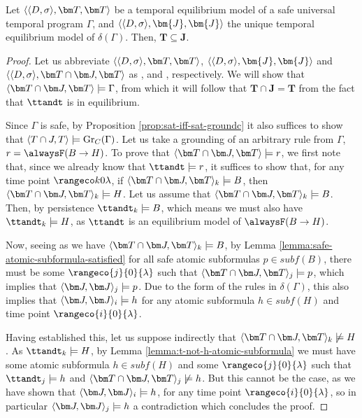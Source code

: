 \begin{proposition}\label{prop:simplified-facts}
  Let $\qttandt$ be a temporal equilibrium model of a safe universal
  temporal program $\Gamma$, and
  $\langle \dsigma, \bm{J},\bm{J} \rangle$ the unique temporal
  equilibrium model of $\delta(\Gamma)$. Then,
  $\bm{T} \subseteq \bm{J}$.
\end{proposition}
\begin{proof}
  Let us abbreviate $\qttandt$,
  $\langle \dsigma, \bm{J},\bm{J} \rangle$ and $\qttjandt$ as \ttandt,
  \tjandj and \ttjandt, respectively. We will show that
  $\ttjandt \models \Gamma$, from which it will follow that
  $\bm{T} \cap \bm{J} = \bm{T}$ from the fact that $\ttandt$ is in
  equilibrium.

  Since $\Gamma$ is safe, by Proposition
  \ref{prop:sat-iff-sat-groundc} it also suffices to show that
  $\langle T \cap J, T \rangle \models \operatorname{Gr}_{C}(\Gamma)$. Let us
  take a grounding of an arbitrary rule from $\Gamma$,
  $r = \tempruleshort$. To prove that $\ttjandt \models r$, we first
  note that, since we already know that $\ttandt \models r$, it
  suffices to show that, for any time point $\kinlambda$, if
  $\ttjandt_k \models B$, then $\ttjandt_k \models H$. Let us assume
  that $\ttjandt_k \models B$. Then, by persistence
  $\ttandt_k \models B$, which means we must also have
  $\ttandt_k \models H$, as $\ttandt$ is an equilibrium model of
  $\tempruleshort$.

  Now, seeing as we have $\ttjandt_k \models B$, by Lemma
  \ref{lemma:safe-atomic-subformula-satisfied} for all safe atomic
  subformulas $p \in subf(B)$, there must be some
  $\rangeco{j}{0}{\lambda}$ such that $\ttjandt_j \models p$, which
  implies that $\tjandj_j \models p$. Due to the form of the rules in
  $\delta(\Gamma)$, this also implies that $\tjandj_i \models h$ for
  any atomic subformula $h \in subf(H)$ and time point
  $\rangeco{i}{0}{\lambda}$.

  Having established this, let us suppose indirectly that
  $\ttjandt_k \not\models H$. As $\ttandt_k \models H$, by Lemma
  \ref{lemma:t-not-h-atomic-subformula} we must have some atomic
  subformula $h \in subf(H)$ and some $\rangeco{j}{0}{\lambda}$ such
  that $\ttandt_j \models h$ and $\ttjandt_j \not\models h$. But this
  cannot be the case, as we have shown that $\tjandj_i \models h$, for
  any time point $\rangeco{i}{0}{\lambda}$, so in particular
  $\tjandj_j \models h$ a contradiction which concludes the proof.
\end{proof}


